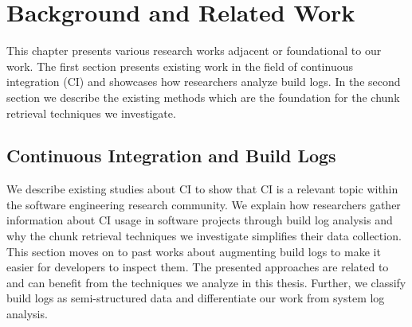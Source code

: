 \documentclass[\myrootdir/main.tex]{subfiles}
\begin{document}
\chapter{Background and Related Work}
\label{sec:rw}
This chapter presents various research works adjacent or foundational to our work.
The first section presents existing work in the field of continuous integration (CI) and showcases how researchers analyze build logs.
In the second section we describe the existing methods which are the foundation for the chunk retrieval techniques we investigate.

\section{Continuous Integration and Build Logs}
We describe existing studies about CI to show that CI is a relevant topic within the software engineering research community.
We explain how researchers gather information about CI usage in software projects through build log analysis and why the chunk retrieval techniques we investigate simplifies their data collection.
This section moves on to past works about augmenting build logs to make it easier for developers to inspect them.
The presented approaches are related to and can benefit from the techniques we analyze in this thesis.
Further, we classify build logs as semi-structured data and differentiate our work from system log analysis.





\end{document}

